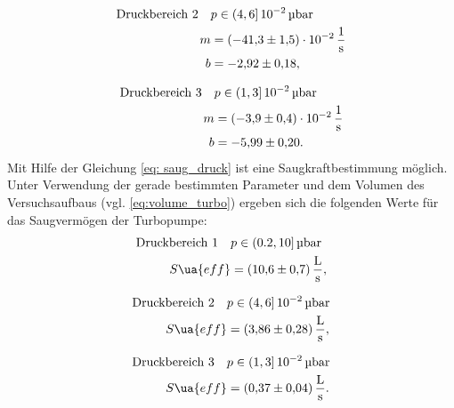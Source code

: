 \begin{align}
  \label{eq: regression_turbo_druck_2}
  \begin{aligned}
  \text{Druckbereich 2} \quad  &p\in(4,6]\,\num{e-2}\,\si{\micro\bar} \\
  m&=\SI{-41.3\pm1.5 e-2}{\per\second} \\
  b&=\num{-2.92 \pm0.18 },
\end{aligned}
\end{align}

\begin{align}
  \label{eq: regression_turbo_druck_3}
  \begin{aligned}
  \text{Druckbereich 3} \quad  &p\in(1,3]\,\num{e-2}\,\si{\micro\bar} \\
  m&=\SI{-3.9\pm0.4 e-2}{\per\second} \\
  b&=\num{-5.99 \pm0.20 }.
\end{aligned}
\end{align}
Mit Hilfe der Gleichung \eqref{eq: saug_druck} ist eine Saugkraftbestimmung möglich.
Unter Verwendung der gerade bestimmten Parameter und dem Volumen des Versuchsaufbaus
(vgl. \eqref{eq:volume_turbo}) ergeben sich die folgenden Werte für das Saugvermögen der Turbopumpe:
\begin{align}
  \label{eq:turbo_saug_1}
  \begin{aligned}
    \text{Druckbereich 1} \quad  &p\in(0.2,10]\,\si{\micro\bar} \\
   S\ua{eff}&=\SI{10.6\pm 0.7}{\litre\per\second},
\end{aligned}
\end{align}

\begin{align}
  \label{eq:turbo_saug_2}
  \begin{aligned}
  \text{Druckbereich 2} \quad  &p\in(4,6]\,\num{e-2}\,\si{\micro\bar} \\
   S\ua{eff}&=\SI{3.86\pm 0.28}{\litre\per\second},
\end{aligned}
\end{align}

\begin{align}
  \label{eq:turbo_saug_3}
  \begin{aligned}
    \text{Druckbereich 3} \quad  &p\in(1,3]\,\num{e-2}\,\si{\micro\bar} \\
   S\ua{eff}&=\SI{0.37\pm 0.04}{\litre\per\second}.
\end{aligned}
\end{align}

